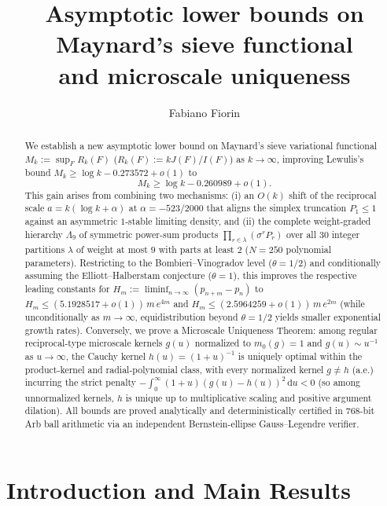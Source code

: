 \documentclass[11pt, reqno]{amsart}
\title[Asymptotic bounds on Maynard's sieve functional]{%
Asymptotic lower bounds on Maynard's sieve functional\\
and microscale uniqueness}
\author{Fabiano Fiorin}
\theoremstyle{remark}
\numberwithin{equation}{section}
\newcommand{\dd}{\,\mathrm{d}}
\begin{document}
\begin{abstract}
We establish a new asymptotic lower bound on Maynard's sieve variational functional
$M_k := \sup_F R_k(F)$ ($R_k(F) := k J(F)/I(F)$) as $k \to \infty$, improving Lewulis's
bound $M_k \ge \log k - 0.273572 + o(1)$ to
\[
M_k \ge \log k - 0.260989 + o(1).
\]
This gain arises from combining two mechanisms: (i) an $O(k)$ shift of the reciprocal
scale $a = k(\log k + \alpha)$ at $\alpha = -523/2000$ that aligns the simplex
truncation $P_1 \le 1$ against an asymmetric $1$-stable limiting density, and
(ii) the complete weight-graded hierarchy $\Lambda_9$ of symmetric power-sum products
$\prod_{r \in \lambda} (\sigma^r P_r)$ over all $30$ integer partitions $\lambda$ of
weight at most $9$ with parts at least $2$ ($N = 250$ polynomial parameters).
Restricting to the Bombieri--Vinogradov level ($\theta = 1/2$) and conditionally
assuming the Elliott--Halberstam conjecture ($\theta = 1$), this improves the respective
leading constants for $H_m := \liminf_{n\to\infty}(p_{n+m}-p_n)$ to
$H_m \le (5.1928517 + o(1))\,m\,e^{4m}$ and $H_m \le (2.5964259 + o(1))\,m\,e^{2m}$
(while unconditionally as $m \to \infty$, equidistribution beyond $\theta = 1/2$ yields
smaller exponential growth rates). Conversely, we prove a Microscale Uniqueness Theorem:
among regular reciprocal-type microscale kernels $g(u)$ normalized to $m_0(g)=1$ and
$g(u) \sim u^{-1}$ as $u \to \infty$, the Cauchy kernel $h(u) = (1+u)^{-1}$ is uniquely optimal
within the product-kernel and radial-polynomial class, with every normalized kernel $g \neq h$
(a.e.) incurring the strict penalty $-\int_0^\infty (1+u)(g(u) - h(u))^2 \dd u < 0$ (so among
unnormalized kernels, $h$ is unique up to multiplicative scaling and positive argument dilation).
All bounds are proved
analytically and deterministically certified in
$768$-bit Arb ball arithmetic via an independent Bernstein-ellipse Gauss--Legendre verifier.
\end{abstract}

\maketitle

\section{Introduction and Main Results}
\end{document}

